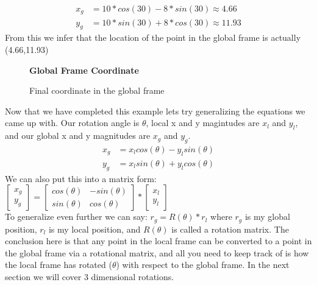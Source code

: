 \documentclass[12pt,letterpaper,boxed]{hmcpset}
\begin{document}
	\begin{align*}
	x_{g} &= 10*cos(30)-8*sin(30) \approx 4.66\\
	y_{g} &= 10*sin(30)+8*cos(30) \approx 11.93
	\end{align*}
From this we infer that the location of the point in the global frame is actually (4.66,11.93)
\begin{figure}[H]
	\centering
	\textbf{Global Frame Coordinate}\par\medskip
	\caption{Final coordinate in the global frame}
	\label{fig:GlobalFrameCoordinate}
\end{figure}

Now that we have completed this example lets try generalizing the equations we came up with. Our rotation angle is $\theta$, local x and y magintudes are $x_{l}$ and $y_{l}$, and our global x and y magnitudes are $x_{g}$ and $y_{g}$.
	\begin{align*}
	x_{g} &= x_{l}cos(\theta)-y_{l}sin(\theta)\\
	y_{g} &= x_{l}sin(\theta)+y_{l}cos(\theta)
	\end{align*}
We can also put this into a matrix form:
\begin{math}
	\begin{bmatrix}
	x_{g}\\
	y_{g}
	\end{bmatrix}=
	\begin{bmatrix}
	cos(\theta)&-sin(\theta)\\
	sin(\theta)&cos(\theta)
	\end{bmatrix}*
	\begin{bmatrix}
	x_{l}\\
	y_{l}
	\end{bmatrix}
\end{math}\\
To generalize even further we can say: $r_{g} = R(\theta)*r_{l}$ where $r_{g}$ is my global position, $r_{l}$ is my local position, and $R(\theta)$ is called a rotation matrix. The conclusion here is that any point in the local frame can be converted to a point in the global frame via a rotational matrix, and all you need to keep track of is how the local frame has rotated ($\theta$) with respect to the global frame. In the next section we will cover 3 dimensional rotations.



\end{document}
